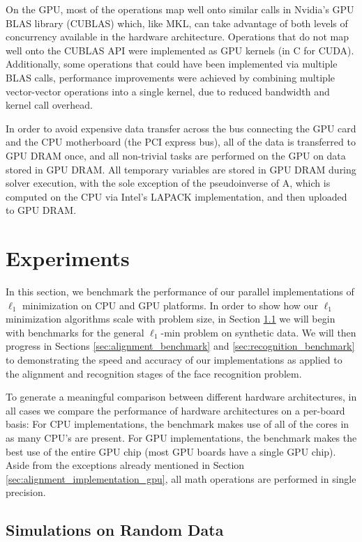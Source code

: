 \documentclass[10pt,twocolumn,letterpaper]{article}
\begin{document}
On the GPU, most of the operations map well onto similar calls in Nvidia's GPU
BLAS library (CUBLAS) which, like MKL, can take advantage of both levels of
concurrency available in the hardware architecture.  Operations that do not map
well onto the CUBLAS API were implemented as GPU kernels (in C for CUDA).
Additionally, some operations that could have been implemented via multiple
BLAS calls, performance improvements were achieved by combining multiple
vector-vector operations into a single kernel, due to reduced bandwidth and
kernel call overhead.  

In order to avoid expensive data transfer across the bus connecting the GPU
card and the CPU motherboard (the PCI express bus), all of the data is
transferred to GPU DRAM once, and all non-trivial tasks are performed on the
GPU on data stored in GPU DRAM.  All temporary variables are stored in GPU DRAM
during solver execution, with the sole exception of the pseudoinverse of A,
which is computed on the CPU via Intel's LAPACK implementation, and then
uploaded to GPU DRAM.  

\section{Experiments} \label{sec:experiment} In this section, we benchmark the
performance of our parallel implementations of $\ell_1$ minimization on CPU and
GPU platforms.  In order to show how our $\ell_1$ minimization algorithms scale
with problem size, in Section \ref{sec:simulation} we will begin with
benchmarks for the general $\ell_1$-min problem on synthetic data.  We will
then progress in Sections \ref{sec:alignment_benchmark} and
\ref{sec:recognition_benchmark} to demonstrating the speed and accuracy of our
implementations as applied to the alignment and recognition stages of the face
recognition problem.

To generate a meaningful comparison between different hardware architectures,
in all cases we compare the performance of hardware architectures on a
per-board basis:  For CPU implementations, the benchmark makes use of all of
the cores in as many CPU's are present.  For GPU implementations, the benchmark
makes the best use of the entire GPU chip (most GPU boards have a single GPU
chip).  Aside from the exceptions already mentioned in Section
\ref{sec:alignment_implementation_gpu}, all math operations are performed in
single precision.

\subsection{Simulations on Random Data}
\label{sec:simulation}
\end{document}

